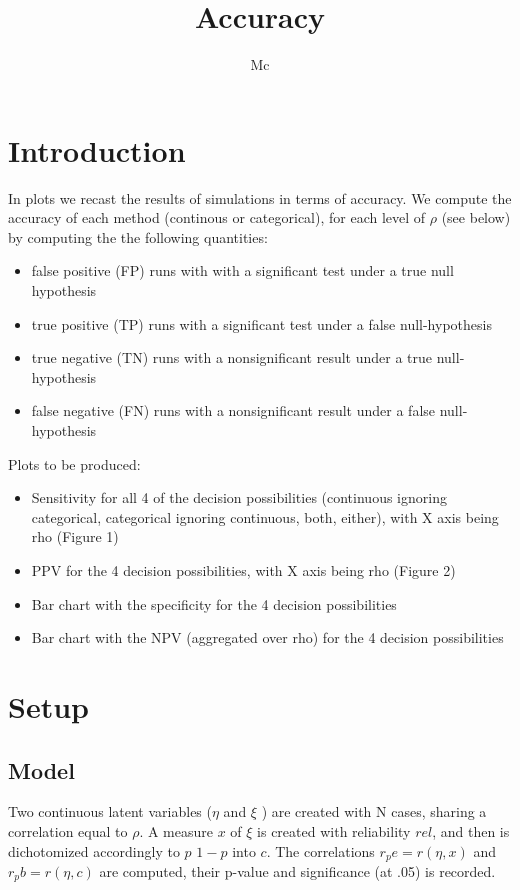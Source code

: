 \documentclass{article}
\begin{document}

\title{Accuracy}

\author{Mc}
\maketitle
\section*{Introduction}
In plots we recast the results of simulations in terms of accuracy. We compute the accuracy of each method (continous or categorical), for each level of \(\rho\) (see below) by computing the  the following quantities:
\begin{itemize}
  \item false positive (FP)  runs with  with a significant test under a true null hypothesis
  \item true positive (TP) runs with a significant test under a false null-hypothesis 
  \item true negative (TN) runs  with a nonsignificant result under a true null-hypothesis
  \item false negative (FN) runs with a nonsignificant result under a false null-hypothesis

\end{itemize}

Plots to be produced:
\begin{itemize}
  \item Sensitivity for all 4 of the decision possibilities (continuous ignoring categorical, categorical ignoring continuous, both, either), with X axis being rho (Figure 1)
  \item PPV for the 4 decision possibilities, with X axis being rho (Figure 2)
  \item Bar chart with the specificity for the 4 decision possibilities
  \item Bar chart with the NPV (aggregated over rho) for the 4 decision possibilities
\end{itemize}

\section*{Setup}
\subsection*{Model}
Two continuous latent variables (\(\eta\) and \(\xi\) ) are created with N cases, sharing a correlation equal to \(\rho\). A measure \(x\) of \(\xi\) is created with reliability \(rel\), and then  is dichotomized accordingly to \(p\) \(1-p\) into \(c\). The correlations \( r_pe=r(\eta,x) \)  and \( r_pb=r(\eta,c) \) are computed, their p-value and significance (at .05) is recorded.
\end{document}
